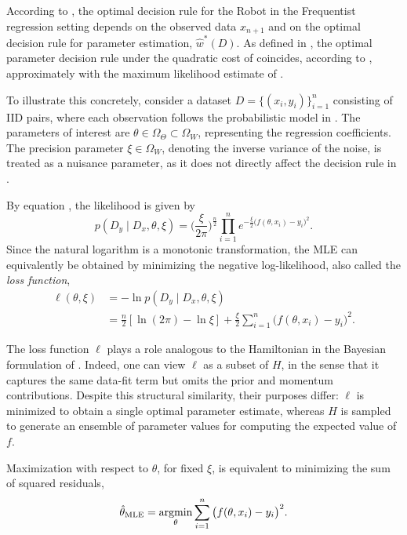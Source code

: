 \begin{remark}
	\label{rm:frequentist_regression}
	According to , the optimal decision rule for the Robot in the Frequentist regression setting depends on the observed data $x_{n+1}$ and on the optimal decision rule for parameter estimation, $\hat{w}^*(D)$. As defined in , the optimal parameter decision rule under the quadratic cost of  coincides, according to , approximately with the maximum likelihood estimate of .
	
	To illustrate this concretely, consider a dataset $D = \{(x_i, y_i)\}_{i=1}^n$ consisting of IID pairs, where each observation follows the probabilistic model in . The parameters of interest are $\theta \in \Omega_\Theta \subset \Omega_W$, representing the regression coefficients. The precision parameter $\xi \in \Omega_W$, denoting the inverse variance of the noise, is treated as a nuisance parameter, as it does not directly affect the decision rule in .
	
	By equation , the likelihood is given by
	\begin{equation}
		p(D_y \mid D_x, \theta, \xi) 
		= \bigg(\frac{\xi}{2\pi}\bigg)^{\!\frac{n}{2}}
		\prod_{i=1}^n e^{-\frac{\xi}{2}\big(f(\theta, x_i) - y_i\big)^2}.
		\label{eq:freq_reg_likelihood}
	\end{equation}
	Since the natural logarithm is a monotonic transformation, the MLE can equivalently be obtained by minimizing the negative log-likelihood, also called the \textit{loss function},
	\begin{equation}
		\begin{split}
			\ell(\theta, \xi)
			&= -\ln p(D_y \mid D_x, \theta, \xi) \\
			&= \frac{n}{2}[\ln(2\pi) -\ln\xi]
			+ \frac{\xi}{2}\sum_{i=1}^n \big(f(\theta, x_i) - y_i\big)^2.
		\end{split}
	\end{equation}
	
	The loss function $\ell$ plays a role analogous to the Hamiltonian in the Bayesian formulation of . Indeed, one can view $\ell$ as a subset of $H$, in the sense that it captures the same data-fit term but omits the prior and momentum contributions. Despite this structural similarity, their purposes differ: $\ell$ is minimized to obtain a single optimal parameter estimate, whereas $H$ is sampled to generate an ensemble of parameter values for computing the expected value of $f$.
	
	Maximization with respect to $\theta$, for fixed $\xi$, is equivalent to minimizing the sum of squared residuals,
	\begin{equation}
		\hat{\theta}_{\text{MLE}}
		= \operatorname*{argmin}_{\theta}
		\sum_{i=1}^n \big(f(\theta, x_i) - y_i\big)^2.
	\end{equation}
\end{remark}

